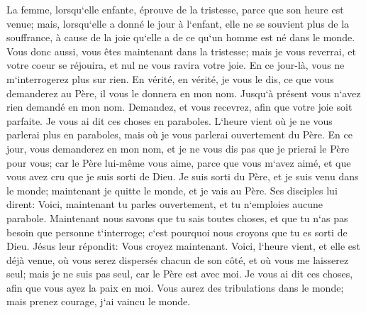 \verse La femme, lorsqu`elle enfante, éprouve de la tristesse, parce que son heure est venue; mais, lorsqu`elle a donné le jour à l`enfant, elle ne se souvient plus de la souffrance, à cause de la joie qu`elle a de ce qu`un homme est né dans le monde. 
\verse Vous donc aussi, vous êtes maintenant dans la tristesse; mais je vous reverrai, et votre coeur se réjouira, et nul ne vous ravira votre joie. 
\verse En ce jour-là, vous ne m`interrogerez plus sur rien. En vérité, en vérité, je vous le dis, ce que vous demanderez au Père, il vous le donnera en mon nom. 
\verse Jusqu`à présent vous n`avez rien demandé en mon nom. Demandez, et vous recevrez, afin que votre joie soit parfaite. 
\verse Je vous ai dit ces choses en paraboles. L`heure vient où je ne vous parlerai plus en paraboles, mais où je vous parlerai ouvertement du Père. 
\verse En ce jour, vous demanderez en mon nom, et je ne vous dis pas que je prierai le Père pour vous; 
\verse car le Père lui-même vous aime, parce que vous m`avez aimé, et que vous avez cru que je suis sorti de Dieu. 
\verse Je suis sorti du Père, et je suis venu dans le monde; maintenant je quitte le monde, et je vais au Père. 
\verse Ses disciples lui dirent: Voici, maintenant tu parles ouvertement, et tu n`emploies aucune parabole. 
\verse Maintenant nous savons que tu sais toutes choses, et que tu n`as pas besoin que personne t`interroge; c`est pourquoi nous croyons que tu es sorti de Dieu. 
\verse Jésus leur répondit: Vous croyez maintenant. 
\verse Voici, l`heure vient, et elle est déjà venue, où vous serez dispersés chacun de son côté, et où vous me laisserez seul; mais je ne suis pas seul, car le Père est avec moi. 
\verse Je vous ai dit ces choses, afin que vous ayez la paix en moi. Vous aurez des tribulations dans le monde; mais prenez courage, j`ai vaincu le monde. 

\chapter{}

